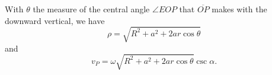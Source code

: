 \documentclass{ximera}
\begin{document}














With $\theta$ the measure of the central angle $\angle EOP$ that $\overline{OP}$ makes with the downward vertical, we have
\[
  \rho = \sqrt{R^2 + a^2 + 2ar \cos \theta}
\]
and 
\[
    v_P = \omega \sqrt{R^2 + a^2 + 2ar \cos \theta} \csc \alpha .
\]
\end{document}
